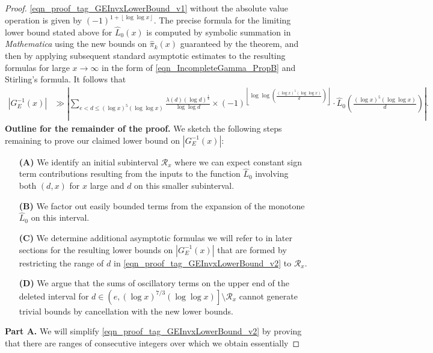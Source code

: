 \documentclass[11pt,reqno,a4letter]{article}
\numberwithin{figure}{section}
\numberwithin{table}{section}
\newcommand{\floor}[1]{\left\lfloor #1 \right\rfloor}
\theoremstyle{plain}
\numberwithin{theorem}{section}
\theoremstyle{definition}
\begin{document}
\begin{proof}
\eqref{eqn_proof_tag_GEInvxLowerBound_v1} without the 
absolute value operation is given by $(-1)^{1+\floor{\log\log x}}$. 
The precise formula for the 
limiting lower bound stated above for $\widehat{L}_0(x)$ is computed by symbolic summation 
in \emph{Mathematica} using the new bounds on $\widehat{\pi}_k(x)$ guaranteed by 
the theorem, and then by applying subsequent standard asymptotic estimates to the 
resulting formulas for large $x \rightarrow \infty$ 
in the form of \eqref{eqn_IncompleteGamma_PropB} and Stirling's formula. 
It follows that 
\begin{align} 
\label{eqn_proof_tag_GEInvxLowerBound_v2} 
|G_E^{-1}(x)| & \gg \left\lvert \sum_{e < d \leq (\log x)^{5} (\log\log x)} 
     \frac{\lambda(d) (\log d)^{\frac{1}{4}}}{\log\log d} \times 
     (-1)^{\floor{\log\log\left(\frac{(\log x)^{5} (\log\log x)}{d}\right)}} \cdot 
     \widehat{L}_0\left(\frac{(\log x)^{5} (\log\log x)}{d}\right) \right\rvert. 
\end{align} 
\textbf{Outline for the remainder of the proof.} 
We sketch the following steps remaining to prove our claimed lower bound on 
$|G_E^{-1}(x)|$: 
\begin{itemize}[itemsep=0pt,topsep=4pt,leftmargin=0.75in] 
\item[\textbf{(A)}] We identify an initial subinterval $\mathcal{R}_x$ where we can expect 
     constant sign term contributions resulting from the inputs to the function $\widehat{L}_0$ 
     involving both $(d, x)$ for $x$ large and $d$ on this smaller subinterval. 
\item[\textbf{(B)}] We factor out easily bounded terms from the expansion of the 
     monotone $\widehat{L}_0$ on this interval. 
\item[\textbf{(C)}] We determine additional asymptotic formulas we will 
     refer to in later sections for the resulting lower bounds on $|G_E^{-1}(x)|$ 
     that are formed by restricting the range of $d$ in 
     \eqref{eqn_proof_tag_GEInvxLowerBound_v2} to $\mathcal{R}_x$. 
\item[\textbf{(D)}] We argue 
     that the sums of oscillatory terms on the upper end of the deleted interval 
     for $d \in \left(e, (\log x)^{7/3} (\log\log x)\right] \setminus \mathcal{R}_x$ 
     cannot generate trivial bounds by cancellation with the new lower bounds. 
\end{itemize} 
\textbf{Part A.} 
We will simplify \eqref{eqn_proof_tag_GEInvxLowerBound_v2} by proving that there are 
ranges of consecutive integers over which we obtain essentially 

\end{proof}
\end{document}
